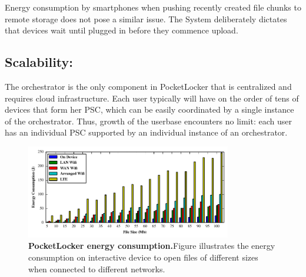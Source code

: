 Energy consumption by smartphones when pushing recently created file chunks to
remote storage does not pose a similar issue.  The System deliberately dictates
that devices wait until plugged in before they commence upload.

\subsection{Scalability:\space} The orchestrator is the only component in
PocketLocker that is centralized and requires cloud infrastructure. Each user
typically will have on the order of tens of devices that form her PSC, which
can be easily coordinated by a single instance of the orchestrator. Thus,
growth of the userbase encounters no limit: each user has an individual PSC
supported by an individual instance of an orchestrator.


\begin{figure}[t]
  \centering
  \includegraphics[width=0.8\textwidth]{./figures/energyconsumption.pdf}
  
  \vspace*{-0.1in}

  \caption{\small \textbf{PocketLocker energy consumption.}Figure illustrates the energy
  consumption on interactive device to open files of different sizes when
    connected to different networks.}

  \label{fig-evaluation-energy}
  
  \vspace*{0.05in}


  \vspace*{-0.2in}

\end{figure}


